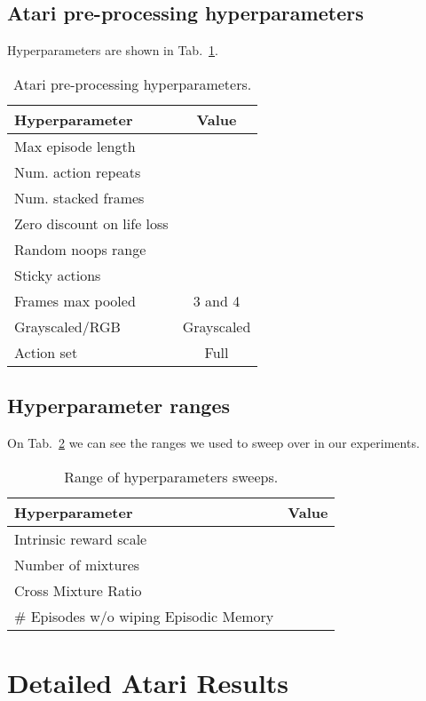 \documentclass{article} \usepackage{iclr2020_conference,times}
\begin{document}
\subsection{Atari pre-processing hyperparameters}
\label{atari_hypers}
Hyperparameters are shown in Tab.~\ref{table_hyper_atari}.
\begin{table}[ht!]
\centering
\begin{tabular}{l|c}
\textbf{Hyperparameter} & \textbf{Value} \\ \hline
Max episode length &   \\ \hline 
Num. action repeats &  \\ \hline
Num. stacked frames &  \\ \hline
Zero discount on life loss &  \\ \hline
Random noops range &  \\ \hline
Sticky actions &  \\ \hline
Frames max pooled & 3 and 4\\ \hline
Grayscaled/RGB & Grayscaled \\ \hline
Action set & Full \\ \hline
\end{tabular}
\caption{Atari pre-processing hyperparameters.}
\label{table_hyper_atari}
\vspace{-2ex}
\end{table}

\subsection{Hyperparameter ranges}
On Tab.~\ref{table_hyper_ranges} we can see the ranges we used to sweep over in our experiments.
\begin{table}[ht!]
\centering
\begin{tabular}{l|c}
\textbf{Hyperparameter} & \textbf{Value} \\ \hline
Intrinsic reward scale  &  \\ \hline
Number of mixtures  &  \\ \hline
Cross Mixture Ratio &  \\ \hline
\# Episodes w/o wiping Episodic Memory &  \\ \hline
\end{tabular}
\caption{Range of hyperparameters sweeps.}
\label{table_hyper_ranges}
\end{table}

\clearpage
\newpage
\section{Detailed Atari Results}
\label{results_all_games}
\end{document}
